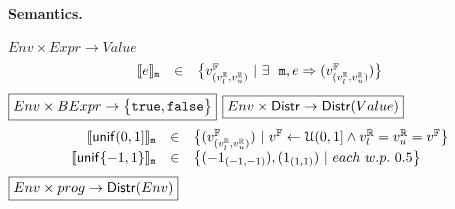 \documentclass[a4paper,11pt]{article}
\begin{document}
\paragraph{Semantics.}
$\boxed{Env \times Expr \to Value }$
%
\[
	\begin{array}{rcl}
	\llbracket e \rrbracket_{\mathtt{m}}
	& \in &  
	\big\{v^{\mathbb{F}}_{(v^{\mathbb{R}}_{l}, v^{\mathbb{R}}_{u})} ~|~
	\exists ~~  
	\mathtt{m},  
	e \Rightarrow (v^{\mathbb{F}}_{(v^{\mathbb{R}}_{l}, v^{\mathbb{R}}_{u})})\big\}
	\end{array}
\]
%
$\boxed{Env \times BExpr \to \big\{\mathtt{true}, \mathtt{false} \big\} }$
%
\extend{
\[
	\begin{array}{rcl}
	\sem{\expr_1 < \expr_2}_{\trsmem}
	& \triangleq &  
	\sem{\expr_1}_{\trsmem}^1 < \sem{\expr_2}_{\trsmem}^1\\
	\sem{\expr_1 = \expr_2}_{\trsmem}
	& \triangleq &  
	\sem{\expr_1}_{\trsmem}^1 < \sem{\expr_2}_{\trsmem}^1
	\end{array}
	\hspace{2cm}
	\begin{array}{rcl}
	\sem{ \neg \bexpr}_{\trsmem}
	& \triangleq &  
	\neg \sem{\bexpr}_{\trsmem}
	\\
	\sem{\bexpr_{1} \land \bexpr_{2}}_{\trsmem}
	& \triangleq &  
	\sem{\bexpr_{1}}_{\trsmem} \land \sem{\bexpr_{2}}_{\trsmem}
	\\
	\sem{\bexpr_{1} \lor \bexpr_{2}}_{\trsmem}
	& \triangleq &  
	\sem{\bexpr_{1}}_{\trsmem} \lor \sem{\bexpr_{2}}_{\trsmem}
	\end{array}
\]
}
%
$
\boxed{Env \times \mathsf{Distr} \to 
\mathsf{Distr}(Value)}
$
%
\[
	\begin{array}{rcl}
	\llbracket \mathsf{unif}(0, 1] \rrbracket_{\mathtt{m}}
	& \in & 
	\big\{
	(v^{\mathbb{F}}_{(v^{\mathbb{R}}_{l}, v^{\mathbb{R}}_{u})}) ~|~
	v^{\mathbb{F}} \leftarrow \mathcal{U}(0, 1]
	\land v^{\mathbb{R}}_{l} = v^{\mathbb{R}}_{u} = v^{\mathbb{F}}
	\big\}\\
	\llbracket \mathsf{unif}\{-1, 1\} \rrbracket_{\mathtt{m}}
	& \in & 
	\big\{
	(-1_{(-1, -1)}), (1_{(1, 1)}) ~|~
	each ~ w.p. ~ 0.5 
	\big\}\\	
	\end{array}
\]
%
$\boxed{Env \times prog \to \mathsf{Distr}(Env)}$
\end{document}
